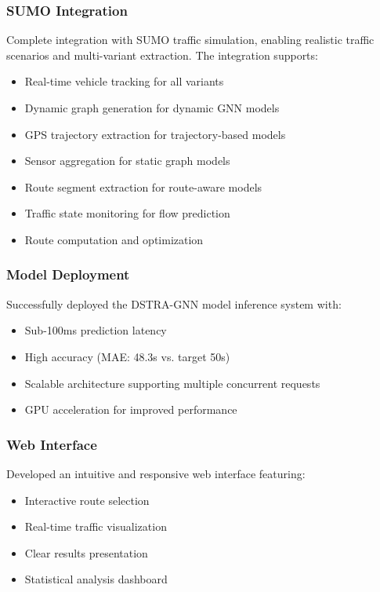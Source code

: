 \subsubsection{SUMO Integration}
Complete integration with SUMO traffic simulation, enabling realistic traffic scenarios and multi-variant extraction. The integration supports:
\begin{itemize}
    \item Real-time vehicle tracking for all variants
    \item Dynamic graph generation for dynamic GNN models
    \item GPS trajectory extraction for trajectory-based models
    \item Sensor aggregation for static graph models
    \item Route segment extraction for route-aware models
    \item Traffic state monitoring for flow prediction
    \item Route computation and optimization
\end{itemize}

\subsubsection{Model Deployment}
Successfully deployed the DSTRA-GNN model inference system with:
\begin{itemize}
    \item Sub-100ms prediction latency
    \item High accuracy (MAE: 48.3s vs. target 50s)
    \item Scalable architecture supporting multiple concurrent requests
    \item GPU acceleration for improved performance
\end{itemize}

\subsubsection{Web Interface}
Developed an intuitive and responsive web interface featuring:
\begin{itemize}
    \item Interactive route selection
    \item Real-time traffic visualization
    \item Clear results presentation
    \item Statistical analysis dashboard
\end{itemize}

